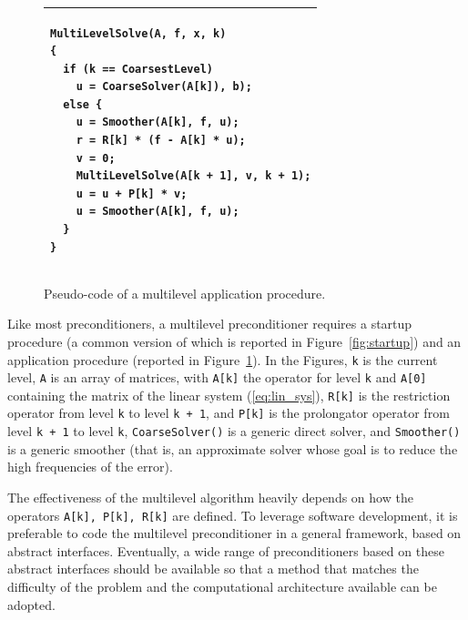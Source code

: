 \documentclass{article}[11pt]
\begin{document}
\begin{figure}
\begin{center}
\begin{tabular}{ p{12cm} }
\hline
\vspace*{0.1cm}
\hspace*{1cm}
\begin{minipage}{10cm}
\begin{verbatim}
MultiLevelSolve(A, f, x, k) 
{
  if (k == CoarsestLevel)
    u = CoarseSolver(A[k]), b);
  else {
    u = Smoother(A[k], f, u);
    r = R[k] * (f - A[k] * u);
    v = 0;
    MultiLevelSolve(A[k + 1], v, k + 1);
    u = u + P[k] * v;
    u = Smoother(A[k], f, u);
  }
}
\end{verbatim}
\vspace*{0.1cm}
\end{minipage} \\
\hline
\end{tabular}
\caption{Pseudo-code of a multilevel application procedure.}
\label{fig:application}
\end{center}
\end{figure}

Like most preconditioners, a multilevel preconditioner requires a startup 
procedure (a common version of which is reported in Figure~\ref{fig:startup})
  and an application procedure (reported in Figure~\ref{fig:application}).
In the Figures, \verb!k! is the current level,
\verb!A! is an array of matrices, with \verb!A[k]! the operator for 
level \verb!k! and \verb!A[0]! containing the matrix of the linear system 
(\ref{eq:lin_sys}), 
\verb!R[k]! is the restriction operator from level \verb!k! 
to level \verb!k + 1!, and \verb!P[k]! is the prolongator
operator from level \verb!k + 1! to level \verb!k!,
\verb!CoarseSolver()! is a generic direct solver, and
\verb!Smoother()! is a generic smoother (that is, an approximate solver
whose goal is to reduce the high frequencies of the error).

The effectiveness of the multilevel algorithm heavily depends on 
how the operators \verb!A[k], P[k], R[k]! are defined. To leverage software
development, it is preferable to code the multilevel preconditioner in a
general framework, based on abstract interfaces. Eventually, a  wide range
of preconditioners based on these abstract interfaces should be available so
that a method that matches the difficulty of the problem and the computational
architecture available can be adopted.

\smallskip
\end{document}
